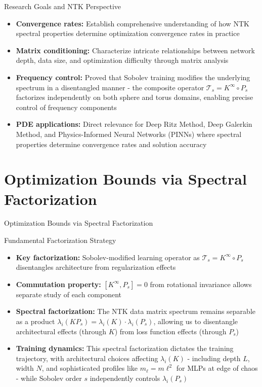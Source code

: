 \documentclass{beamer}
\begin{document}
\begin{frame}{Research Goals and NTK Perspective}
\begin{itemize}
\item \textbf{Convergence rates:} Establish comprehensive understanding of how NTK spectral properties determine optimization convergence rates in practice

\item \textbf{Matrix conditioning:} Characterize intricate relationships between network depth, data size, and optimization difficulty through matrix analysis

\item \textbf{Frequency control:} Proved that Sobolev training modifies the underlying spectrum in a disentangled manner - the composite operator $\mathcal{T}_s = K^{\infty} \circ P_s$ factorizes independently on both sphere and torus domains, enabling precise control of frequency components

\item \textbf{PDE applications:} Direct relevance for Deep Ritz Method, Deep Galerkin Method, and Physics-Informed Neural Networks (PINNs) where spectral properties determine convergence rates and solution accuracy
\end{itemize}
\end{frame}

\section{Optimization Bounds via Spectral Factorization}

\begin{frame}
\begin{center}
\huge{Optimization Bounds via Spectral Factorization}
\end{center}
\end{frame}

\begin{frame}{Fundamental Factorization Strategy}
\begin{itemize}
\item \textbf{Key factorization:} Sobolev-modified learning operator as $\mathcal{T}_s = K^{\infty} \circ P_s$ disentangles architecture from regularization effects

\item \textbf{Commutation property:} $[K^{\infty}, P_s] = 0$ from rotational invariance allows separate study of each component
\item \textbf{Spectral factorization:} The NTK data matrix spectrum remains separable as a product $\lambda_i(KP_s) = \lambda_i(K) \cdot \lambda_i(P_s)$, allowing us to disentangle architectural effects (through $K$) from loss function effects (through $P_s$)

\item \textbf{Training dynamics:} This spectral factorization dictates the training trajectory, with architectural choices affecting $\lambda_i(K)$ - including depth $L$, width $N$, and sophisticated profiles like $m_\ell = m\ell^2$ for MLPs at edge of chaos - while Sobolev order $s$ independently controls $\lambda_i(P_s)$
\end{itemize}
\end{frame}
\end{document}
